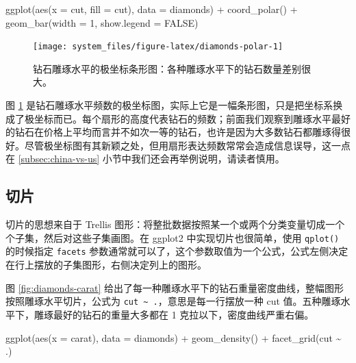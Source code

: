 \documentclass[
  b5paper,
  UTF8,twoside]{book}
\newenvironment{Shaded}{\begin{snugshade}}{\end{snugshade}}
\newcommand{\AttributeTok}[1]{\textcolor[rgb]{0.77,0.63,0.00}{#1}}
\newcommand{\ConstantTok}[1]{\textcolor[rgb]{0.00,0.00,0.00}{#1}}
\newcommand{\DecValTok}[1]{\textcolor[rgb]{0.00,0.00,0.81}{#1}}
\newcommand{\FunctionTok}[1]{\textcolor[rgb]{0.00,0.00,0.00}{#1}}
\newcommand{\NormalTok}[1]{#1}
\newcommand{\SpecialCharTok}[1]{\textcolor[rgb]{0.00,0.00,0.00}{#1}}
\begin{document}
\begin{Shaded}
\begin{Highlighting}[]
\FunctionTok{ggplot}\NormalTok{(}\FunctionTok{aes}\NormalTok{(}\AttributeTok{x =}\NormalTok{ cut, }\AttributeTok{fill =}\NormalTok{ cut), }\AttributeTok{data =}\NormalTok{ diamonds) }\SpecialCharTok{+}
  \FunctionTok{coord\_polar}\NormalTok{() }\SpecialCharTok{+}
  \FunctionTok{geom\_bar}\NormalTok{(}\AttributeTok{width =} \DecValTok{1}\NormalTok{, }\AttributeTok{show.legend =} \ConstantTok{FALSE}\NormalTok{)}
\end{Highlighting}
\end{Shaded}

\begin{figure}

{\centering \texttt{[image: system\_files/figure-latex/diamonds-polar-1]} 

}

\caption[钻石雕琢水平的极坐标条形图]{钻石雕琢水平的极坐标条形图：各种雕琢水平下的钻石数量差别很大。}\label{fig:diamonds-polar}
\end{figure}





图 \ref{fig:diamonds-polar} 是钻石雕琢水平频数的极坐标图，实际上它是一幅条形图，只是把坐标系换成了极坐标而已。每个扇形的高度代表钻石的频数；前面我们观察到雕琢水平最好的钻石在价格上平均而言并不如次一等的钻石，也许是因为大多数钻石都雕琢得很好。尽管极坐标图有其新颖之处，但用扇形表达频数常常会造成信息误导，这一点在 \ref{subsec:china-vs-us} 小节中我们还会再举例说明，请读者慎用。

\hypertarget{subsec:facet}{%
\subsection{切片}\label{subsec:facet}}

切片的思想来自于 Trellis 图形：将整批数据按照某一个或两个分类变量切成一个个子集，然后对这些子集画图。在 ggplot2 中实现切片也很简单，使用 \texttt{qplot()} 的时候指定 \texttt{facets} 参数通常就可以了，这个参数取值为一个公式，公式左侧决定在行上摆放的子集图形，右侧决定列上的图形。

图 \ref{fig:diamonds-carat} 给出了每一种雕琢水平下的钻石重量密度曲线，整幅图形按照雕琢水平切片，公式为 \texttt{cut\ \textasciitilde{}\ .}，意思是每一行摆放一种 cut 值。五种雕琢水平下，雕琢最好的钻石的重量大多都在 1 克拉以下，密度曲线严重右偏。

\begin{Shaded}
\begin{Highlighting}[]
\FunctionTok{ggplot}\NormalTok{(}\FunctionTok{aes}\NormalTok{(}\AttributeTok{x =}\NormalTok{ carat), }\AttributeTok{data =}\NormalTok{ diamonds) }\SpecialCharTok{+}
  \FunctionTok{geom\_density}\NormalTok{() }\SpecialCharTok{+}
  \FunctionTok{facet\_grid}\NormalTok{(cut }\SpecialCharTok{\textasciitilde{}}\NormalTok{ .)}
\end{Highlighting}
\end{Shaded}
\end{document}
